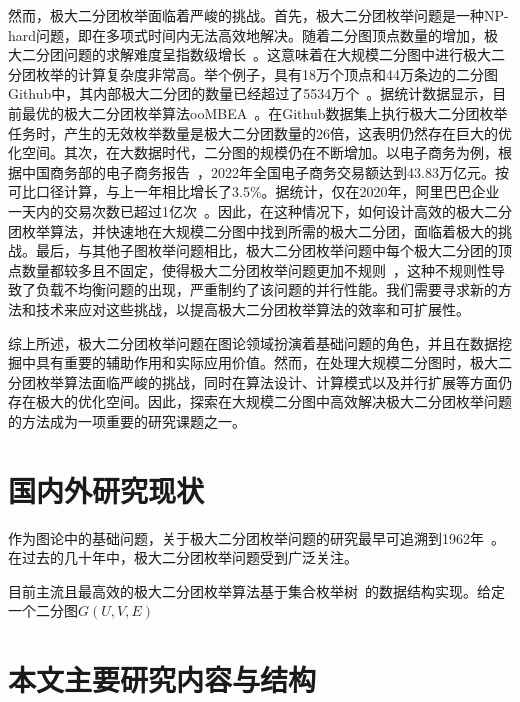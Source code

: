 然而，极大二分团枚举面临着严峻的挑战。首先，极大二分团枚举问题是一种NP-hard问题，即在多项式时间内无法高效地解决。随着二分图顶点数量的增加，极大二分团问题的求解难度呈指数级增长~\cite{MICA04}。这意味着在大规模二分图中进行极大二分团枚举的计算复杂度非常高。举个例子，具有18万个顶点和44万条边的二分图Github中，其内部极大二分团的数量已经超过了5534万个~\cite{konect}。据统计数据显示，目前最优的极大二分团枚举算法ooMBEA~\cite{ooMBE22}。在Github数据集上执行极大二分团枚举任务时，产生的无效枚举数量是极大二分团数量的26倍，这表明仍然存在巨大的优化空间。其次，在大数据时代，二分图的规模仍在不断增加。以电子商务为例，根据中国商务部的电子商务报告~\cite{ECommerceReport}，2022年全国电子商务交易额达到43.83万亿元。按可比口径计算，与上一年相比增长了3.5\%。据统计，仅在2020年，阿里巴巴企业一天内的交易次数已超过1亿次~\cite{MEB20}。因此，在这种情况下，如何设计高效的极大二分团枚举算法，并快速地在大规模二分图中找到所需的极大二分团，面临着极大的挑战。最后，与其他子图枚举问题相比，极大二分团枚举问题中每个极大二分团的顶点数量都较多且不固定，使得极大二分团枚举问题更加不规则~\cite{Irregularity12}，这种不规则性导致了负载不均衡问题的出现，严重制约了该问题的并行性能。我们需要寻求新的方法和技术来应对这些挑战，以提高极大二分团枚举算法的效率和可扩展性。

综上所述，极大二分团枚举问题在图论领域扮演着基础问题的角色，并且在数据挖掘中具有重要的辅助作用和实际应用价值。然而，在处理大规模二分图时，极大二分团枚举算法面临严峻的挑战，同时在算法设计、计算模式以及并行扩展等方面仍存在极大的优化空间。因此，探索在大规模二分图中高效解决极大二分团枚举问题的方法成为一项重要的研究课题之一。

\section{国内外研究现状}
\label{sec:related}

作为图论中的基础问题，关于极大二分团枚举问题的研究最早可追溯到1962年~\cite{MBE62}。在过去的几十年中，极大二分团枚举问题受到广泛关注。






目前主流且最高效的极大二分团枚举算法基于集合枚举树~\cite{SEtree92}的数据结构实现。给定一个二分图$G(U, V, E)$





\section{本文主要研究内容与结构}